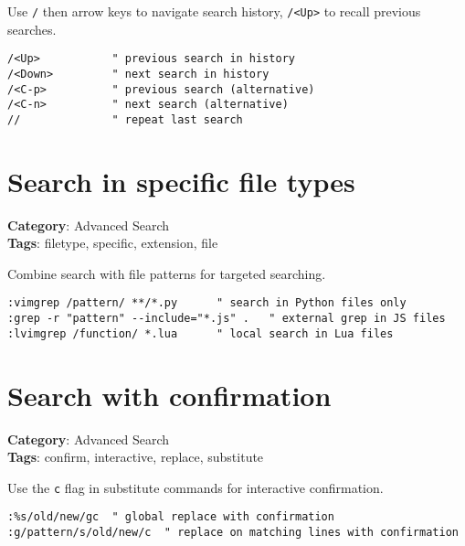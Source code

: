 Use {\footnotesize \Verb§/§} then arrow keys to navigate search history, {\footnotesize \Verb§/<Up>§} to recall previous searches.

\begin{Exa*}{}
\begin{Verbatim}[fontsize=\footnotesize, breaklines, breakanywhere]
/<Up>           " previous search in history
/<Down>         " next search in history
/<C-p>          " previous search (alternative)
/<C-n>          " next search (alternative)
//              " repeat last search
\end{Verbatim}
\end{Exa*}

\section{Search in specific file types}

\textbf{Category}: Advanced Search\\ \textbf{Tags}: filetype, specific, extension, file
\vspace{0.5cm}

Combine search with file patterns for targeted searching.

\begin{Exa*}{}
\begin{Verbatim}[fontsize=\footnotesize, breaklines, breakanywhere]
:vimgrep /pattern/ **/*.py      " search in Python files only
:grep -r "pattern" --include="*.js" .   " external grep in JS files
:lvimgrep /function/ *.lua      " local search in Lua files
\end{Verbatim}
\end{Exa*}

\section{Search with confirmation}

\textbf{Category}: Advanced Search\\ \textbf{Tags}: confirm, interactive, replace, substitute
\vspace{0.5cm}

Use the {\footnotesize \Verb§c§} flag in substitute commands for interactive confirmation.

\begin{Exa*}{}
\begin{Verbatim}[fontsize=\footnotesize, breaklines, breakanywhere]
:%s/old/new/gc  " global replace with confirmation
:g/pattern/s/old/new/c  " replace on matching lines with confirmation
\end{Verbatim}
\end{Exa*}

